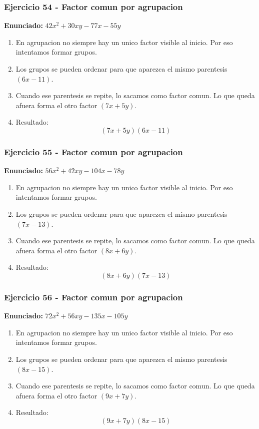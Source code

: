 \documentclass[11pt,a4paper]{article}
\begin{document}
\vspace{0.2cm}
\subsubsection*{Ejercicio 54 - Factor comun por agrupacion}
\textbf{Enunciado:} $ 42 x^{2} + 30 x y - 77 x - 55 y $\par
\begin{enumerate}[leftmargin=2em]
\item En agrupacion no siempre hay un unico factor visible al inicio. Por eso intentamos formar grupos.
\item Los grupos se pueden ordenar para que aparezca el mismo parentesis \((6 x - 11)\).
\item Cuando ese parentesis se repite, lo sacamos como factor comun. Lo que queda afuera forma el otro factor \((7 x + 5 y)\).
\item Resultado: \[\boxed{\left(7 x + 5 y\right)\left(6 x - 11\right)}\]
\end{enumerate}

\vspace{0.2cm}
\subsubsection*{Ejercicio 55 - Factor comun por agrupacion}
\textbf{Enunciado:} $ 56 x^{2} + 42 x y - 104 x - 78 y $\par
\begin{enumerate}[leftmargin=2em]
\item En agrupacion no siempre hay un unico factor visible al inicio. Por eso intentamos formar grupos.
\item Los grupos se pueden ordenar para que aparezca el mismo parentesis \((7 x - 13)\).
\item Cuando ese parentesis se repite, lo sacamos como factor comun. Lo que queda afuera forma el otro factor \((8 x + 6 y)\).
\item Resultado: \[\boxed{\left(8 x + 6 y\right)\left(7 x - 13\right)}\]
\end{enumerate}

\vspace{0.2cm}
\subsubsection*{Ejercicio 56 - Factor comun por agrupacion}
\textbf{Enunciado:} $ 72 x^{2} + 56 x y - 135 x - 105 y $\par
\begin{enumerate}[leftmargin=2em]
\item En agrupacion no siempre hay un unico factor visible al inicio. Por eso intentamos formar grupos.
\item Los grupos se pueden ordenar para que aparezca el mismo parentesis \((8 x - 15)\).
\item Cuando ese parentesis se repite, lo sacamos como factor comun. Lo que queda afuera forma el otro factor \((9 x + 7 y)\).
\item Resultado: \[\boxed{\left(9 x + 7 y\right)\left(8 x - 15\right)}\]
\end{enumerate}
\end{document}
